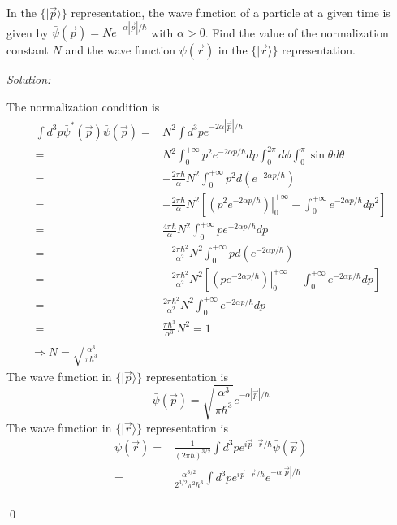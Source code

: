 \documentclass[12pt,a4paper]{article}
\newenvironment{problem}[2][Problem]{\begin{trivlist}
\item[\hskip \labelsep {\bfseries #1}\hskip \labelsep {\bfseries #2.}]}{\end{trivlist}}
\newenvironment{sol}
    {\emph{Solution:}
    }
    {
    \qed
    }
\begin{document}
\begin{problem}{4}
In the $\{|\vec{p}\rangle\}$ representation, the wave function of a particle at a given time is given by $\bar{\psi}(\vec{p})=Ne^{-\alpha|\vec{p}|/\hbar}$ with $\alpha>0$. Find the value of the normalization constant $N$ and the wave function $\psi(\vec{r})$ in the $\{|\vec{r}\rangle\}$ representation.
\end{problem}
\begin{sol}
The normalization condition is
\begin{gather}
\begin{align}
\nonumber\int d^3p\bar{\psi}^*(\vec{p})\bar{\psi}(\vec{p})=&N^2\int d^3pe^{-2\alpha|\vec{p}|/\hbar}\\
\nonumber=&N^2\int_0^{+\infty}p^2e^{-2\alpha p/\hbar}dp\int_0^{2\pi}d\phi\int_0^{\pi}\sin\theta d\theta\\
\nonumber=&-\frac{2\pi\hbar}{\alpha}N^2\int_0^{+\infty}p^2d\left(e^{-2\alpha p/\hbar}\right)\\
\nonumber=&-\frac{2\pi\hbar}{\alpha}N^2\left[\left.\left(p^2e^{-2\alpha p/\hbar}\right)\right|_0^{+\infty}-\int_0^{+\infty}e^{-2\alpha p/\hbar}dp^2\right]\\
\nonumber=&\frac{4\pi\hbar}{\alpha}N^2\int_0^{+\infty}pe^{-2\alpha p/\hbar}dp\\
\nonumber=&-\frac{2\pi\hbar^2}{\alpha^2}N^2\int_0^{+\infty}pd\left(e^{-2\alpha p/\hbar}\right)\\
\nonumber=&-\frac{2\pi\hbar^2}{\alpha^2}N^2\left[\left.\left(pe^{-2\alpha p/\hbar}\right)\right|_0^{+\infty}-\int_0^{+\infty}e^{-2\alpha p/\hbar}dp\right]\\
\nonumber=&\frac{2\pi\hbar^2}{\alpha^2}N^2\int_0^{+\infty}e^{-2\alpha p/\hbar}dp\\
=&\frac{\pi\hbar^3}{\alpha^3}N^2=1
\end{align}\\
\Longrightarrow N=\sqrt{\frac{\alpha^3}{\pi\hbar^3}}
\end{gather}
The wave function in $\{|\vec{p}\rangle\}$ representation is
\begin{equation}
\bar{\psi}(\vec{p})=\sqrt{\frac{\alpha^3}{\pi\hbar^3}}e^{-\alpha|\vec{p}|/\hbar}
\end{equation}
The wave function in $\{|\vec{r}\rangle\}$ representation is
\begin{align}
\nonumber\psi(\vec{r})=&\frac{1}{(2\pi\hbar)^{3/2}}\int d^3pe^{i\vec{p}\cdot\vec{r}/\hbar}\bar{\psi}(\vec{p})\\
\nonumber=&\frac{\alpha^{3/2}}{2^{3/2}\pi^2\hbar^3}\int d^3pe^{i\vec{p}\cdot\vec{r}/\hbar}e^{-\alpha|\vec{p}|/\hbar}\\

\end{align}
\end{sol}
\end{document}
